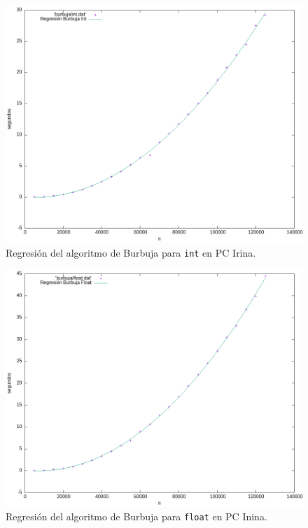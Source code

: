 \documentclass[12pt]{article}
\begin{document}
     \begin{figure}
        \centering
        \includegraphics[width=0.8\linewidth]{images/Burbuja/graficos/ajusteInt.png}
        \cprotect\caption{Regresión del algoritmo de Burbuja para \verb|int| en PC Irina.}
        \label{fig:Burbuja_ajuste_int_graf}
    \end{figure}
    \begin{figure}
        \centering
        \includegraphics[width=0.8\linewidth]{images/Burbuja/graficos/ajusteFloat.png}
        \cprotect\caption{Regresión del algoritmo de Burbuja para \verb|float| en PC Inina.}
        \label{fig:Burbuja_ajuste_float_graf}
    \end{figure}
\end{document}
